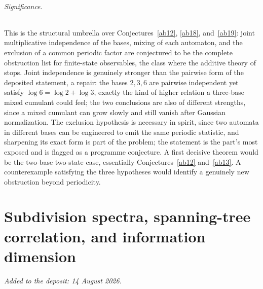 \documentclass[11pt]{article}
\theoremstyle{definition}
\begin{document}
\paragraph{Significance.}
This is the structural umbrella over Conjectures~\ref{ab12}, \ref{ab18}, and~\ref{ab19}: joint multiplicative independence of the bases, mixing of each automaton, and the exclusion of a common periodic factor are conjectured to be the complete obstruction list for finite-state observables, the class where the additive theory of~\cite{Drm01} stops.  Joint independence is genuinely stronger than the pairwise form of the deposited statement, a repair: the bases $2,3,6$ are pairwise independent yet satisfy $\log6=\log2+\log3$, exactly the kind of higher relation a three-base mixed cumulant could feel; the two conclusions are also of different strengths, since a mixed cumulant can grow slowly and still vanish after Gaussian normalization.  The exclusion hypothesis is necessary in spirit, since two automata in different bases can be engineered to emit the same periodic statistic, and sharpening its exact form is part of the problem; the statement is the part's most exposed and is flagged as a programme conjecture.  A first decisive theorem would be the two-base two-state case, essentially Conjectures~\ref{ab12} and~\ref{ab13}.  A counterexample satisfying the three hypotheses would identify a genuinely new obstruction beyond periodicity.

\part{Subdivision spectra, spanning-tree correlation, and information dimension}

\medskip\noindent\emph{Added to the deposit: 14 August 2026.}\par\medskip
\end{document}
